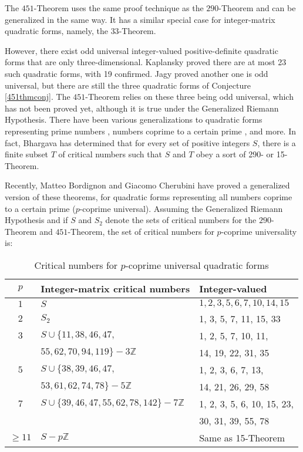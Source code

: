 \documentclass[letterpaper, 12pt]{article}
\begin{document}
The $451$-Theorem uses the same proof technique as the $290$-Theorem and can be generalized in the same way. It has a similar special case for integer-matrix quadratic forms, namely, the $33$-Theorem.

However, there exist odd universal integer-valued positive-definite quadratic forms that are only three-dimensional. Kaplansky \cite{IrvingKaplansky1995} proved there are at most 23 such quadratic forms, with 19 confirmed. Jagy \cite{Jagy1996FiveRO} proved another one is odd universal, but there are still the three quadratic forms of Conjecture \ref{451thmconj}. The $451$-Theorem relies on these three being odd universal, which has not been proved yet, although it is true under the Generalized Riemann Hypothesis. There have been various generalizations to quadratic forms representing prime numbers \cite{primeuniversaloeis}, numbers coprime to a certain prime \cite{coprimeuniv}, and more. In fact, Bhargava has determined that for every set of positive integers $S$, there is a finite subset $T$ of critical numbers such that $S$ and $T$ obey a sort of 290- or 15-Theorem.

Recently, Matteo Bordignon and Giacomo Cherubini have proved a generalized version of these theorems, for quadratic forms representing all numbers coprime to a certain prime ($p$-coprime universal). Assuming the Generalized Riemann Hypothesis and if $S$ and $S_2$ denote the sets of critical numbers for the $290$-Theorem and $451$-Theorem, the set of critical numbers for $p$-coprime universality is:
\begin{table}[H]
    \begin{tabular}{|c|l|l|} \hline
        $p$ & Integer-matrix critical numbers & Integer-valued \\ \hline
        $1$ & $S$ & $1, 2, 3, 5, 6, 7, 10, 14, 15$ \\
        $2$ & $S_2$ & 1, 3, 5, 7, 11, 15, 33 \\ \hline
        $3$ & $S \cup \{11, 38, 46, 47,$ &  1, 2, 5, 7, 10, 11, \\
        & $55, 62, 70, 94, 119\} - 3\mathbb{Z}$ & 14, 19, 22, 31, 35 \\ \hline
        $5$ & $S \cup \{38, 39, 46, 47,$ & 1, 2, 3, 6, 7, 13, \\
        & $53, 61, 62, 74, 78\} - 5\mathbb{Z}$ & 14, 21, 26, 29, 58 \\ \hline
        $7$ & $S \cup \{39, 46, 47, 55, 62, 78, 142\} - 7\mathbb{Z}$ & 1, 2, 3, 5, 6, 10, 15, 23, \\
        && 30, 31, 39, 55, 78 \\ \hline
        $\ge 11$ & $S - p\mathbb{Z}$ & Same as 15-Theorem \\ \hline
    \end{tabular}
    \caption{Critical numbers for $p$-coprime universal quadratic forms}
    \label{coprimeunivtable}
\end{table}
\end{document}
